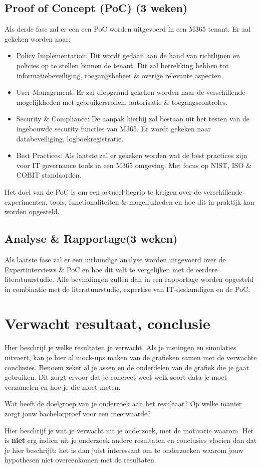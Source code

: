 \subsection{Proof of Concept (PoC) (3 weken)}
Als derde fase zal er een een PoC worden uitgevoerd in een M365 tenant. Er zal gekeken worden naar:
\begin{itemize}
  \item Policy Implementation:
  Dit wordt gedaan aan de hand van richtlijnen en policies op te stellen binnen de tenant. Dit zal betrekking hebben tot informatiebeveiliging, toegangsbeheer \& overige relevante aspecten.
  \item User Management:
  Er zal diepgaand gekeken worden naar de verschillende mogelijkheden met gebruikersrollen, autorisatie \& toegangscontroles.
  \item Security \& Compliance:
  De aanpak hierbij zal bestaan uit het testen van de ingebouwde security functies van M365. Er wordt gekeken naar databeveiliging, logboekregistratie.
  \item Best Practices:
  Als laatste zal er gekeken worden wat de best practices zijn voor IT governance tools in een M365 omgeving. Met focus op NIST, ISO \& COBIT standaarden. 
\end{itemize}
Het doel van de PoC is om een actueel begrip te krijgen over de verschillende experimenten,  tools, functionaliteiten \& mogelijkheden  en hoe dit in praktijk kan worden opgesteld. 

\subsection{ Analyse \& Rapportage(3 weken)}
Als laatste fase zal er een uitbundige analyse worden uitgevoerd over de Expertinterviews \& PoC en hoe dit valt te vergelijken met de eerdere literatuurstudie. Alle bevindingen zullen dan in een rapportage worden opgesteld in combinatie met de literatuurstudie, expertise van IT-deskundigen en de PoC.


\section{Verwacht resultaat, conclusie}%
\label{sec:verwachte_resultaten}

Hier beschrijf je welke resultaten je verwacht. Als je metingen en simulaties uitvoert, kan je hier al mock-ups maken van de grafieken samen met de verwachte conclusies. Benoem zeker al je assen en de onderdelen van de grafiek die je gaat gebruiken. Dit zorgt ervoor dat je concreet weet welk soort data je moet verzamelen en hoe je die moet meten.

Wat heeft de doelgroep van je onderzoek aan het resultaat? Op welke manier zorgt jouw bachelorproef voor een meerwaarde?

Hier beschrijf je wat je verwacht uit je onderzoek, met de motivatie waarom. Het is \textbf{niet} erg indien uit je onderzoek andere resultaten en conclusies vloeien dan dat je hier beschrijft: het is dan juist interessant om te onderzoeken waarom jouw hypothesen niet overeenkomen met de resultaten.

